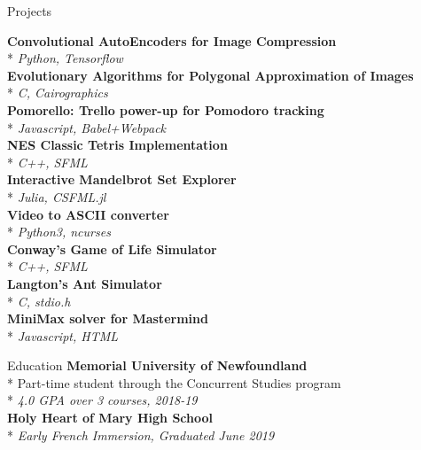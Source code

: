 \documentclass[11pt, letterpaper]{article}
\begin{document}
\begin{section}{Projects}

\begin{multicols}{2}
\textbf{Convolutional AutoEncoders for Image Compression}\\*
\textit{Python, Tensorflow}\\

\textbf{Evolutionary Algorithms for Polygonal Approximation of Images}\\*
\textit{C, Cairographics}\\

\textbf{Pomorello: Trello power-up for Pomodoro tracking}\\*
\textit{Javascript, Babel+Webpack}\\

\textbf{NES Classic Tetris Implementation}\\*
\textit{C++, SFML}\\

\textbf{Interactive Mandelbrot Set Explorer}\\*
\textit{Julia, CSFML.jl}\\

\textbf{Video to ASCII converter}\\*
\textit{Python3, ncurses}\\

\textbf{Conway's Game of Life Simulator}\\*
\textit{C++, SFML}\\

\textbf{Langton's Ant Simulator}\\*
\textit{C, stdio.h}\\

\textbf{MiniMax solver for Mastermind}\\*
\textit{Javascript, HTML}
\end{multicols}

\end{section}

\begin{section}{Education}
\textbf{Memorial University of Newfoundland}\\*
Part-time student through the Concurrent Studies program\\*
\textit{4.0 GPA over 3 courses, 2018-19}\\

\textbf{Holy Heart of Mary High School}\\*
\textit{Early French Immersion, Graduated June 2019}
\end{section}
\end{document}
